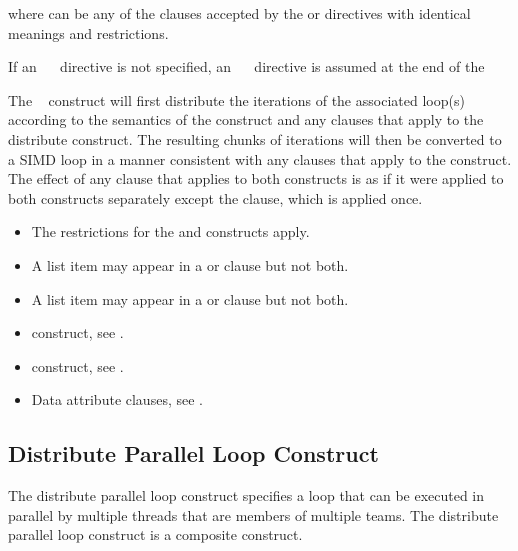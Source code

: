 where  can be any of the clauses accepted by the  or  
directives with identical meanings and restrictions.

If an ~~ directive is not specified, an ~~
directive is assumed at the end of the \fortranspecificend

\descr
The ~ construct will first distribute the iterations of the associated 
loop(s) according to the semantics of the  construct and any clauses that 
apply to the distribute construct. The resulting chunks of iterations will then be 
converted to a SIMD loop in a manner consistent with any clauses that apply to the 
 construct. The effect of any clause that applies to both constructs is as if it were applied to both constructs separately except the  clause, which is applied once.

\restrictions
\begin{itemize}
\item The restrictions for the  and  constructs apply.
\item A list item may appear in a  or  clause but not both.
\item A list item may appear in a  or  clause but not both.

\end{itemize}

\crossreferences
\begin{itemize}
\item {} construct, see 
.

\item {} construct, see 
.

\item Data attribute clauses, see 
.
\end{itemize}









\subsection{Distribute Parallel Loop Construct}
\label{subsec:Distribute Parallel Loop Construct}
\summary
The distribute parallel loop construct specifies a loop that can be executed in parallel by 
multiple threads that are members of multiple teams. The distribute parallel loop construct is a composite construct.

